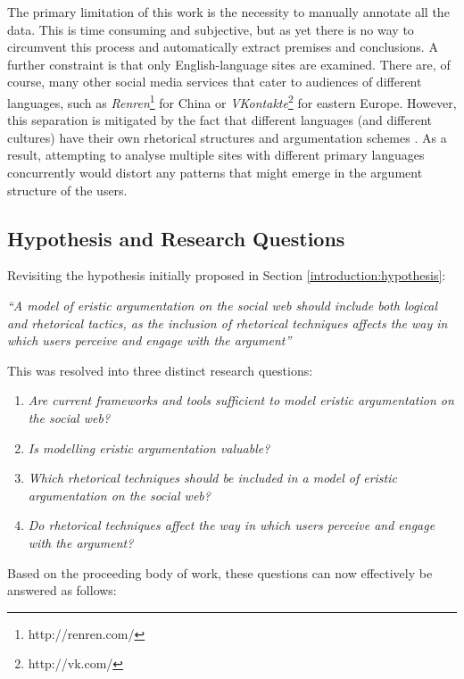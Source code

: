 The primary limitation of this work is the necessity to manually annotate all the data. This is time consuming and subjective, but as yet there is no way to circumvent this process and automatically extract premises and conclusions. A further constraint is that only English-language sites are examined. There are, of course, many other social media services that cater to audiences of different languages, such as \textit{Renren}\footnote{http://renren.com/} for China or \textit{VKontakte}\footnote{http://vk.com/} for eastern Europe. However, this separation is mitigated by the fact that different languages (and different cultures) have their own rhetorical structures and argumentation schemes \citep[p.~21]{Van2004}. As a result, attempting to analyse multiple sites with different primary languages concurrently would distort any patterns that might emerge in the argument structure of the users.

\subsection{Hypothesis and Research Questions}
\label{conclusionsfuture:future:hypothesis}
Revisiting the hypothesis initially proposed in Section \ref{introduction:hypothesis}:

\textit{``A model of eristic argumentation on the social web should include both logical and rhetorical tactics, as the inclusion of rhetorical techniques affects the way in which users perceive and engage with the argument''}

This was resolved into three distinct research questions:
\begin{enumerate}
\item \textit{Are current frameworks and tools sufficient to model eristic argumentation on the social web?}
\item \textit{Is modelling eristic argumentation valuable?}
\item \textit{Which rhetorical techniques should be included in a model of eristic argumentation on the social web?}
\item \textit{Do rhetorical techniques affect the way in which users perceive and engage with the argument?}

\end{enumerate}

Based on the proceeding body of work, these questions can now effectively be answered as follows:

